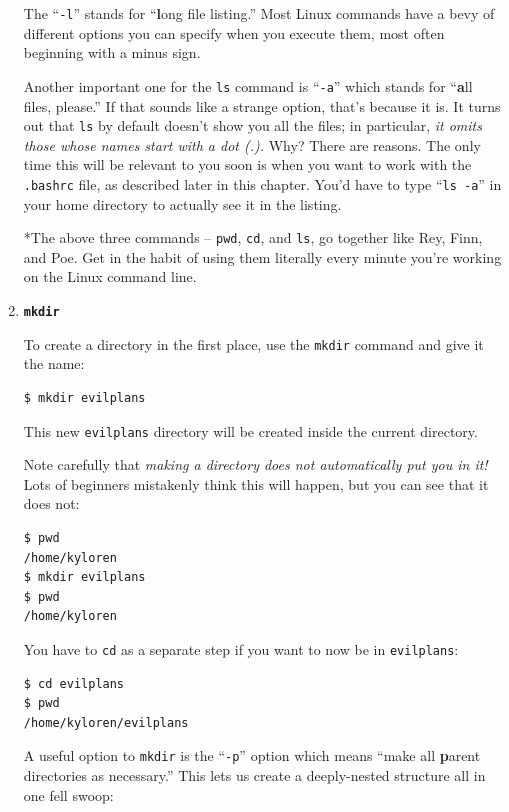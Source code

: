 \begin{enumerate}
The ``\texttt{-l}'' stands for ``\textbf{l}ong file listing.'' Most Linux
commands have a bevy of different options you can specify when you execute
them, most often beginning with a minus sign.

Another important one for the \texttt{ls} command is ``\texttt{-a}'' which
stands for ``\textbf{a}ll files, please.'' If that sounds like a strange
option, that's because it is. It turns out that \texttt{ls} by default doesn't
show you all the files; in particular, \textit{it omits those whose names
start with a dot (.).} Why? There are reasons. The only time this will be
relevant to you soon is when you want to work with the \texttt{.bashrc} file,
as described later in this chapter. You'd have to type ``\texttt{ls -a}'' in
your home directory to actually see it in the listing.


\bigline
\vspace{.1in}
*The above three commands -- \texttt{pwd}, \texttt{cd}, and \texttt{ls}, go
together like Rey, Finn, and Poe. Get in the habit of using them literally
every minute you're working on the Linux command line.
\vspace{.1in}
\bigline

\item \textbf{\texttt{mkdir}}

To create a directory in the first place, use the \texttt{mkdir} command and
give it the name:

\begin{verbatim}
$ mkdir evilplans
\end{verbatim}

This new \texttt{evilplans} directory will be created inside the current
directory.

Note carefully that \textit{making a directory does not automatically put you
in it!} Lots of beginners mistakenly think this will happen, but you can see
that it does not:

\begin{verbatim}
$ pwd
/home/kyloren
$ mkdir evilplans
$ pwd
/home/kyloren
\end{verbatim}

You have to \texttt{cd} as a separate step if you want to now be in
\texttt{evilplans}:

\begin{verbatim}
$ cd evilplans
$ pwd
/home/kyloren/evilplans
\end{verbatim}

A useful option to \texttt{mkdir} is the ``\texttt{-p}'' option which means
``make all \textbf{p}arent directories as necessary.'' This lets us create a
deeply-nested structure all in one fell swoop:


\end{enumerate}
